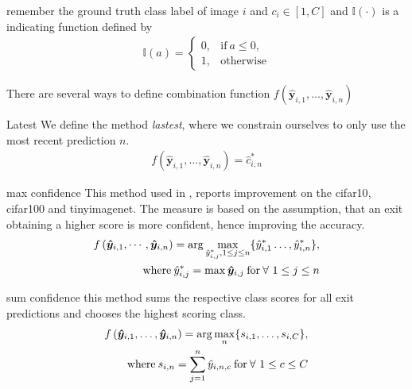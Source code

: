 \begin{enumdescript}
		remember the ground truth class label of image $ i $ and $ c_i \in \left[1, C \right] $ and $ \mathbb{I(\cdot)}  $ is a indicating function defined by
		\begin{align}
		\mathbb{I}(a)= \begin{cases}
		0, & \mathrm{if\:} a \leq 0, \\
		1, & \mathrm{otherwise}
		\end{cases}
		\end{align}
		
		There are several ways to define combination function $ f\left(\mathbf{\hat{y}}_{i,1}, \dots, \mathbf{\hat{y}}_{i,n}\right) $
		\begin{enumdescript}
			
			
			\item[Latest] We define the method \emph{lastest}, where we constrain ourselves to only use the most recent prediction $n$.
			\begin{align}
			f\left(\bm{\hat{y}}_{i,1}, \dots, \bm{\hat{y}}_{i,n} \right) = \hat{c}_{i,n}^{*}
			\end{align}
			
			\item[max confidence] This method used in \cite{kaya_shallow-deep_nodate}, reports improvement on the \gls{cifar10}, \gls{cifar100} and \gls{tinyimagenet}. The measure is based on the assumption, that an exit obtaining a higher score is more confident, hence improving the accuracy.
			\begin{align}
			\begin{split}
			f\left(\bm{\hat{y}}_{i,1}, \cdots, \bm{\hat{y}}_{i,n} \right) = \arg \underset{{\hat{y}_{i,j}^{*}, 1 \le j 
					\le n}}{\max} \{\hat{y}_{i,1}^* \dots, \hat{y}_{i,n}^*\},\\ \text{where\:} \hat{y}_{i,j}^* = \max\bm{\hat{y}}_{i,j} \text{\:for\:} \forall \ 1 \le j \le n
			\end{split}	
			\end{align}
			\item[sum confidence] this method sums the respective class scores for all exit predictions and chooses the highest scoring class. 
			\begin{align}
			\begin{split}
			f\left(\bm{\hat{y}}_{i,1}, \dots, \bm{\hat{y}}_{i,n} \right) = \arg \underset{n}{\max} \{s_{i,1}, \dots, s_{i,C}\}, \\ \text{where\:} s_{i,n} = \sum_{j=1}^{n}\hat{y}_{i,n,c} \text{\:for\:} \forall \ 1\le c \le C
			\end{split}
			\end{align}
			

\end{enumdescript}
\end{enumdescript}
